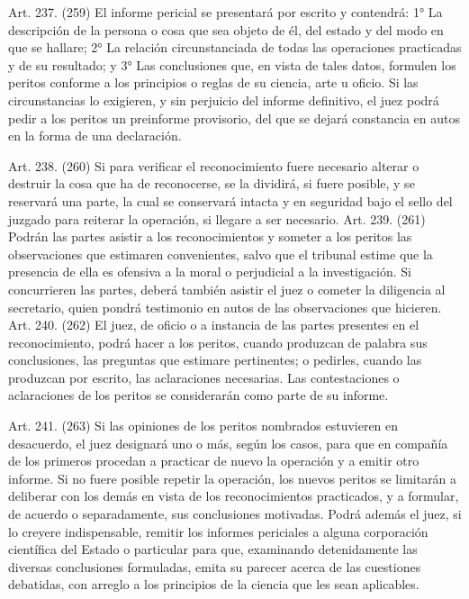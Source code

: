     Art. 237. (259) El informe pericial se presentará por escrito y contendrá:
    1° La descripción de la persona o cosa que sea objeto de él, del estado y del modo en que se hallare;
    2° La relación circunstanciada de todas las operaciones practicadas y de su resultado; y
    3° Las conclusiones que, en vista de tales datos, formulen los peritos conforme a los principios o reglas de su ciencia, arte u oficio.
    Si las circunstancias lo exigieren, y sin perjuicio del informe definitivo, el juez podrá pedir a los peritos un preinforme provisorio, del que se dejará constancia en autos en la forma de una declaración.

    Art. 238. (260) Si para verificar el reconocimiento fuere necesario alterar o destruir la cosa que ha de reconocerse, se la dividirá, si fuere posible, y se reservará una parte, la cual se conservará intacta y en seguridad bajo el sello del juzgado para reiterar la operación, si llegare a ser necesario.
    Art. 239. (261) Podrán las partes asistir a los reconocimientos y someter a los peritos las observaciones que estimaren convenientes, salvo que el tribunal estime que la presencia de ella es ofensiva a la moral o perjudicial a la investigación.
    Si concurrieren las partes, deberá también asistir el juez o cometer la diligencia al secretario, quien pondrá testimonio en autos de las observaciones que hicieren.
    Art. 240. (262) El juez, de oficio o a instancia de las partes presentes en el reconocimiento, podrá hacer a los peritos, cuando produzcan de palabra sus conclusiones, las preguntas que estimare pertinentes; o pedirles, cuando las produzcan por escrito, las aclaraciones necesarias.
    Las contestaciones o aclaraciones de los peritos se considerarán como parte de su informe.

    Art. 241. (263) Si las opiniones de los peritos nombrados estuvieren en desacuerdo, el juez designará uno o más, según los casos, para que en compañía de los primeros procedan a practicar de nuevo la operación y a emitir otro informe.
    Si no fuere posible repetir la operación, los nuevos peritos se limitarán a deliberar con los demás en vista de los reconocimientos practicados, y a formular, de acuerdo o separadamente, sus conclusiones motivadas.
    Podrá además el juez, si lo creyere indispensable, remitir los informes periciales a alguna corporación científica del Estado o particular para que, examinando detenidamente las diversas conclusiones formuladas, emita su parecer acerca de las cuestiones debatidas, con arreglo a los principios de la ciencia que les sean aplicables.

